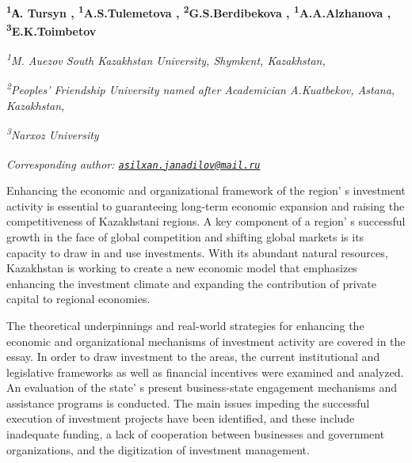 
\begin{articleheader}

{\bfseries \textsuperscript{1}А. Tursyn\textsuperscript{\envelope } \authorid,
\textsuperscript{1}A.S.Tulemetova \authorid,
\textsuperscript{2}G.S.Berdibekova \authorid,
\textsuperscript{1}A.A.Alzhanova \authorid,
\textsuperscript{3}E.K.Toimbetov \authorid}
\end{articleheader}

\begin{affiliation}
\emph{\textsuperscript{1}M. Auezov South Kazakhstan University,
Shymkent, Kazakhstan,}

\emph{\textsuperscript{2}Peoples'{} Friendship University
named after Academician A.Kuatbekov, Astana, Kazakhstan,}

\emph{\textsuperscript{3}Narxoz University}

\emph{{\bfseries \textsuperscript{\envelope }}Corresponding author:
\href{mailto:asilxan.janadilov@mail.ru}{\nolinkurl{asilxan.janadilov@mail.ru}}}
\end{affiliation}

Enhancing the economic and organizational framework of the
region' s investment activity is essential to
guaranteeing long-term economic expansion and raising the
competitiveness of Kazakhstani regions. A key component of a
region' s successful growth in the face of global
competition and shifting global markets is its capacity to draw in and
use investments. With its abundant natural resources, Kazakhstan is
working to create a new economic model that emphasizes enhancing the
investment climate and expanding the contribution of private capital to
regional economies.

The theoretical underpinnings and real-world strategies for enhancing
the economic and organizational mechanisms of investment activity are
covered in the essay. In order to draw investment to the areas, the
current institutional and legislative frameworks as well as financial
incentives were examined and analyzed. An evaluation of the
state' s present business-state engagement mechanisms and
assistance programs is conducted. The main issues impeding the
successful execution of investment projects have been identified, and
these include inadequate funding, a lack of cooperation between
businesses and government organizations, and the digitization of
investment management.

